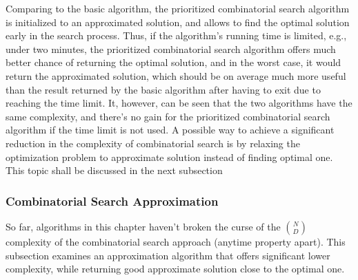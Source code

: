 Comparing to the basic algorithm, the prioritized combinatorial search algorithm is initialized to an approximated solution, and allows to find the optimal solution early in the search process. Thus, if the algorithm's running time is limited, e.g., under two minutes, the prioritized combinatorial search algorithm offers much better chance of returning the optimal solution, and in the worst case, it would return the approximated solution, which should be on average much more useful than the result returned by the basic algorithm after having to exit due to reaching the time limit. It, however, can be seen that the two algorithms have the same complexity, and there's no gain for the prioritized combinatorial search algorithm if the time limit is not used. A possible way to achieve a significant reduction in the complexity of combinatorial search is by relaxing the optimization problem to approximate solution instead of finding optimal one. This topic shall be discussed in the next subsection     

\subsubsection{Combinatorial Search Approximation}
\label{sec:cs.greedy}

So far, algorithms in this chapter haven't broken the curse of the ${N \choose D}$ complexity of the combinatorial search approach (anytime property apart). This subsection examines an approximation algorithm that offers significant lower complexity, while returning good approximate solution close to the optimal one.  

